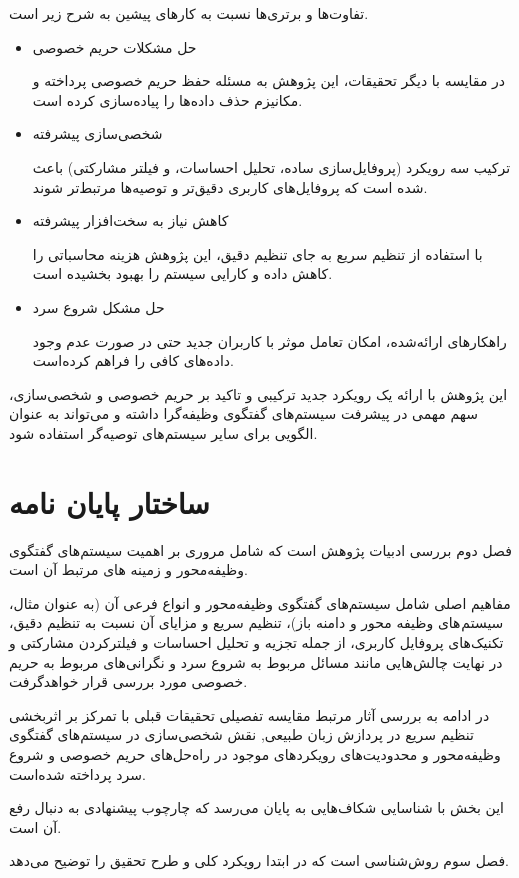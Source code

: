 تفاوت‌ها و برتری‌ها نسبت به کارهای پیشین به شرح زیر است.
\begin{itemize}
\item
حل مشکلات حریم خصوصی

در مقایسه با دیگر تحقیقات، این پژوهش به مسئله حفظ حریم خصوصی پرداخته و مکانیزم حذف داده‌ها را پیاده‌سازی کرده است.
\item
شخصی‌سازی پیشرفته

ترکیب سه رویکرد (پروفایل‌سازی ساده، تحلیل احساسات، و فیلتر مشارکتی) باعث شده است که پروفایل‌های کاربری دقیق‌تر و توصیه‌ها مرتبط‌تر شوند.
\item
کاهش نیاز به سخت‌افزار پیشرفته

با استفاده از تنظیم سریع به جای تنظیم دقیق، این پژوهش هزینه محاسباتی را کاهش داده و کارایی سیستم را بهبود بخشیده است.
\item
حل مشکل شروع سرد

راهکارهای ارائه‌شده، امکان تعامل موثر با کاربران جدید حتی در صورت عدم وجود داده‌های کافی را فراهم کرده‌است.
\end{itemize}

این پژوهش با ارائه یک رویکرد جدید ترکیبی و تاکید بر حریم خصوصی و شخصی‌سازی، سهم مهمی در پیشرفت سیستم‌های گفتگوی وظیفه‌گرا داشته و می‌تواند به عنوان الگویی برای سایر سیستم‌های توصیه‌گر استفاده شود.



\section{ساختار پایان نامه}

فصل دوم بررسی ادبیات پژوهش است که شامل مروری بر اهمیت  سیستم‌های گفتگوی وظیفه‌محور و زمینه های مرتبط آن است.

مفاهیم اصلی شامل سیستم‌های گفتگوی وظیفه‌محور و انواع فرعی آن (به عنوان مثال، سیستم های وظیفه محور و دامنه باز)، تنظیم سریع و مزایای آن نسبت به تنظیم دقیق، تکنیک‌های پروفایل کاربری، از جمله تجزیه و تحلیل احساسات و فیلتر‌کردن مشارکتی و در نهایت چالش‌هایی مانند مسائل مربوط به شروع سرد و نگرانی‌های مربوط به حریم خصوصی مورد بررسی قرار خواهد‌گرفت.

در ادامه به بررسی آثار مرتبط مقایسه تفصیلی تحقیقات قبلی با تمرکز بر اثربخشی تنظیم سریع در پردازش زبان طبیعی, نقش شخصی‌سازی در  سیستم‌های گفتگوی وظیفه‌محور و محدودیت‌های رویکردهای موجود در راه‌حل‌های حریم خصوصی و شروع سرد پرداخته شده‌است.

این بخش با شناسایی شکاف‌هایی به پایان می‌رسد که چارچوب پیشنهادی به دنبال رفع آن است.

فصل سوم روش‌شناسی است که در ابتدا رویکرد کلی و طرح تحقیق را توضیح می‌دهد.

